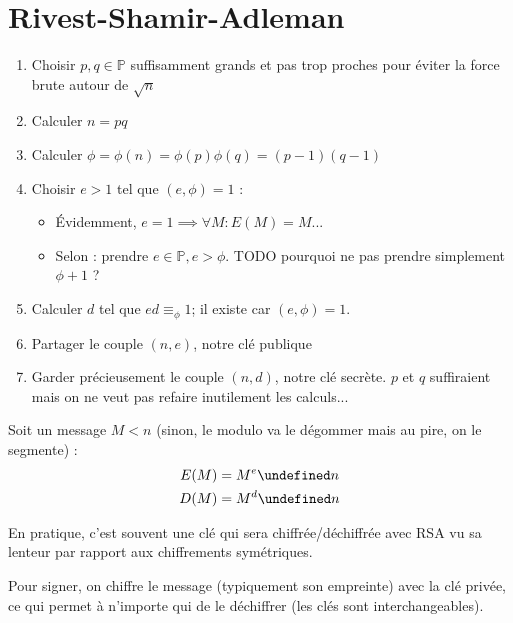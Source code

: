 \documentclass[11pt,twocolumn]{article}
\let\mod\undefined
\DeclareMathOperator{\mod}{mod}
\theoremstyle{plain}
\newcommand{\esP}{\mathbb{P}} %
\begin{document}
\section{Rivest-Shamir-Adleman}
\begin{enumerate}
	\item Choisir $p, q \in \esP$ suffisamment grands et pas trop proches
		pour éviter la force brute autour de $\sqrt n$
	\item Calculer $n=pq$
	\item Calculer $\phi=\phi(n)=\phi(p)\phi(q)=
		\left(p-1\right)\left(q-1\right)$
	\item Choisir $e>1$ tel que $\left(e,\phi\right)=1$ :
		\begin{itemize}
			\item Évidemment, $e=1 \implies \forall M : E(M)=M$...
			\item Selon \cite{Buys} : prendre $e \in \esP, e>\phi$.
				TODO pourquoi ne pas prendre simplement $\phi+1$ ?
		\end{itemize}
	\item Calculer $d$ tel que $ed \equiv_\phi 1$;
		il existe car $\left(e,\phi\right)=1$.
	\item Partager le couple $(n,e)$, notre clé publique
	\item Garder précieusement le couple $(n,d)$, notre clé secrète.
		$p$ et $q$ suffiraient mais
		on ne veut pas refaire inutilement les calculs...
\end{enumerate}

Soit un message $M < n$
(sinon, le modulo va le dégommer mais au pire, on le segmente) :
\begin{align*}
	E(M) &= M^e \mod n \\
	D(M) &= M^d \mod n
\end{align*}

En pratique, c'est souvent une clé qui sera chiffrée/déchiffrée avec
RSA vu sa lenteur par rapport aux chiffrements symétriques.

Pour signer, on chiffre le message (typiquement son empreinte)
avec la clé privée, ce qui permet à n'importe qui de le déchiffrer
(les clés sont interchangeables).
\end{document}
